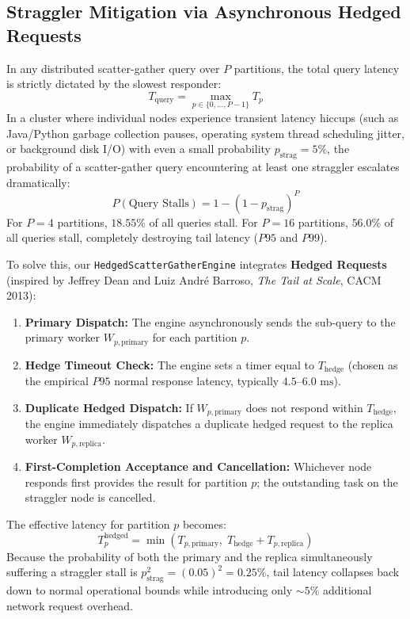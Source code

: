 \subsection{Straggler Mitigation via Asynchronous Hedged Requests}
In any distributed scatter-gather query over $P$ partitions, the total query latency is strictly dictated by the slowest responder:
\begin{equation}
    T_{\text{query}} = \max_{p \in \{0, \dots, P-1\}} T_p
\end{equation}
In a cluster where individual nodes experience transient latency hiccups (such as Java/Python garbage collection pauses, operating system thread scheduling jitter, or background disk I/O) with even a small probability $p_{\text{strag}} = 5\%$, the probability of a scatter-gather query encountering at least one straggler escalates dramatically:
\begin{equation}
    P(\text{Query Stalls}) = 1 - (1 - p_{\text{strag}})^P
\end{equation}
For $P = 4$ partitions, $18.55\%$ of all queries stall. For $P = 16$ partitions, $56.0\%$ of all queries stall, completely destroying tail latency ($P95$ and $P99$).

To solve this, our \texttt{HedgedScatterGatherEngine} integrates \textbf{Hedged Requests} (inspired by Jeffrey Dean and Luiz André Barroso, \textit{The Tail at Scale}, CACM 2013):
\begin{enumerate}
    \item \textbf{Primary Dispatch:} The engine asynchronously sends the sub-query to the primary worker $W_{p, \text{primary}}$ for each partition $p$.
    \item \textbf{Hedge Timeout Check:} The engine sets a timer equal to $T_{\text{hedge}}$ (chosen as the empirical $P95$ normal response latency, typically $4.5\text{--}6.0\text{ ms}$).
    \item \textbf{Duplicate Hedged Dispatch:} If $W_{p, \text{primary}}$ does not respond within $T_{\text{hedge}}$, the engine immediately dispatches a duplicate hedged request to the replica worker $W_{p, \text{replica}}$.
    \item \textbf{First-Completion Acceptance and Cancellation:} Whichever node responds first provides the result for partition $p$; the outstanding task on the straggler node is cancelled.
\end{enumerate}
The effective latency for partition $p$ becomes:
\begin{equation}
    T_p^{\text{hedged}} = \min\left(T_{p, \text{primary}},\; T_{\text{hedge}} + T_{p, \text{replica}}\right)
\end{equation}
Because the probability of both the primary and the replica simultaneously suffering a straggler stall is $p_{\text{strag}}^2 = (0.05)^2 = 0.25\%$, tail latency collapses back down to normal operational bounds while introducing only $\sim 5\%$ additional network request overhead.
